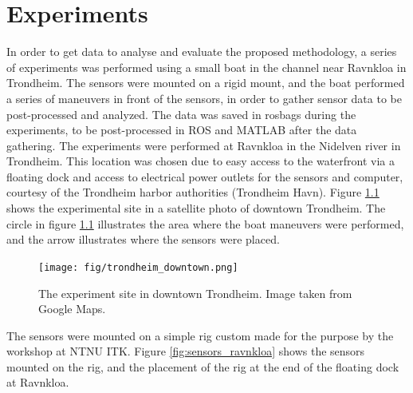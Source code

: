 
\chapter{Experiments}
In order to get data to analyse and evaluate the proposed methodology, a series of experiments was performed using a small boat in the channel near Ravnkloa in Trondheim. The sensors were mounted on a rigid mount, and the boat performed a series of maneuvers in front of the sensors, in order to gather sensor data to be post-processed and analyzed. The data was saved in rosbags during the experiments, to be post-processed in ROS and MATLAB after the data gathering.
The experiments were performed at Ravnkloa in the Nidelven river in Trondheim. This location was chosen due to easy access to the waterfront via a floating dock and access to electrical power outlets for the sensors and computer, courtesy of the Trondheim harbor authorities (Trondheim Havn). Figure \ref{fig:trondheim_sentrum} shows the experimental site in a satellite photo of downtown Trondheim. The circle in figure \ref{fig:trondheim_sentrum} illustrates the area where the boat maneuvers were performed, and the arrow illustrates where the sensors were placed.
\begin{figure}[H]
	\centering
	\texttt{[image: fig/trondheim\_downtown.png]}
	\caption{The experiment site in downtown Trondheim. Image taken from Google Maps.}
	\label{fig:trondheim_sentrum}
\end{figure}
The sensors were mounted on a simple rig custom made for the purpose by the workshop at NTNU ITK. Figure \ref{fig:sensors_ravnkloa} shows the sensors mounted on the rig, and the placement of the rig at the end of the floating dock at Ravnkloa.

